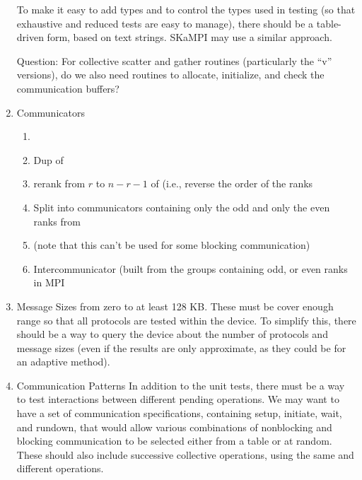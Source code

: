 \documentclass{article}
\begin{document}
\begin{enumerate}
     To make it easy to add types and to control the types used in
     testing (so that exhaustive and reduced tests are easy to
     manage), there should be a table-driven form, based on text
     strings.  SKaMPI may use a similar approach.

     Question:  For collective scatter and gather routines
     (particularly the ``v'' versions), do we also need routines to
     allocate, initialize, and check the communication buffers?

\item Communicators
    \begin{enumerate}
    \item {}
    \item Dup of 
    \item rerank from $r$ to $n-r-1$ of  (i.e.,
    reverse the order of the ranks
    \item Split into communicators containing only the odd and only
    the even ranks from 
    \item {} (note that this can't be used for some
    blocking communication)
    \item Intercommunicator (built from the groups containing odd,
or even ranks in MPI 
    \end{enumerate}

\item Message Sizes from zero to at least 128 KB.  These must be cover
enough range so that all protocols are tested within the device.  To
simplify this, there should be a way to query the device about the
number of protocols and message sizes (even if the results are only
approximate, as they could be for an adaptive method).

\item Communication Patterns
In addition to the unit tests, there must be a way to test
interactions between different pending operations.  We may want to
have a set of communication specifications, containing setup,
initiate, wait, and rundown, that would allow various combinations of
nonblocking and blocking communication to be selected either from a
table or at random.  These should also include successive collective
operations, using the same and different operations.

\end{enumerate}
\end{document}
